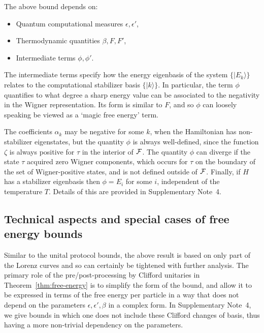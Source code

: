 \documentclass[
onecolumn,
superscriptaddress
]{revtex4-1}
\def\>{\rangle}
\def\F{{\cal F}}
\begin{document}
The above bound depends on: 
\begin{itemize}
	\item Quantum computational measures $\epsilon, \epsilon'$,
	\item Thermodynamic quantities $\beta, F, F'$,
	\item Intermediate terms $\phi, \phi'$. 
\end{itemize}
The intermediate terms specify how the energy eigenbasis of the system $\{|E_k\>\}$ relates to the computational stabilizer basis $\{|k\>\}$.  In particular, the term $\phi$ quantifies to what degree a sharp energy value can be associated to the negativity in the Wigner representation. Its form is similar to $F$, and so $\phi$ can loosely speaking be viewed as a `magic free energy' term. 

The coefficients $\alpha_k$ may be negative for some $k$, when the Hamiltonian has non-stabilizer eigenstates, but the quantity $\phi$ is always well-defined, since the function $\zeta$ is always positive for $\tau$ in the interior of $\F$. The quantity $\phi$ can diverge if the state $\tau$ acquired zero Wigner components, which occurs for $\tau$ on the boundary of the set of Wigner-positive states, and is not defined outside of $\F$. Finally, if $H$ has a stabilizer eigenbasis then $\phi = E_i$ for some $i$, independent of the temperature $T$. Details of this are provided in Supplementary Note~4.

\subsection*{Technical aspects and special cases of free energy bounds}

Similar to the unital protocol bounds, the above result is based on only part of the Lorenz curves and so can certainly be tightened with further analysis. The primary role of the pre/post-processing by Clifford unitaries in Theorem~\ref{thm:free-energy} is to simplify the form of the bound, and allow it to be expressed in terms of the free energy per particle in a way that does not depend on the parameters $\epsilon, \epsilon', \beta$ in a complex form. In Supplementary Note~4, we give bounds in which one does not include these Clifford changes of basis, thus having a more non-trivial dependency on the parameters.
\end{document}
